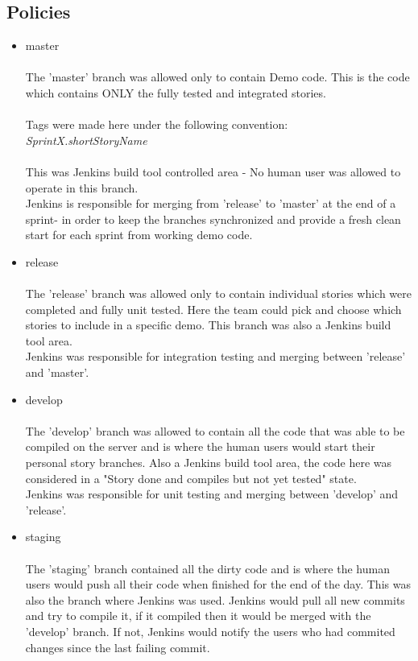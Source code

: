 \subsection {Policies}
\begin{itemize}
\item master\\ \\
The 'master' branch was allowed only to contain Demo code. This is the code which contains ONLY the fully tested and integrated stories.  \\\\Tags were made here under the following convention:\\ \emph{SprintX.shortStoryName} \\\\
This was Jenkins build tool controlled area - No human user was allowed to operate in this branch. \\Jenkins is responsible for merging from 'release' to 'master' at the end of a sprint- in order to keep the branches synchronized and provide a fresh clean start for each sprint from working demo code.\\
\item release\\ \\
The 'release' branch was allowed only to contain individual stories which were completed and fully unit tested. Here the team could pick and choose which stories to include in a specific demo. This branch was also a Jenkins build tool area. \\Jenkins was responsible for integration testing and merging between 'release' and 'master'.
\item develop\\ \\
The 'develop' branch was allowed to contain all the code that was able to be compiled on the server and is where the human users would start their personal story branches. Also a Jenkins build tool area, the code here was considered in a "Story done and compiles but not yet tested" state.\\ Jenkins was responsible for unit testing and merging between 'develop' and 'release'.

\item staging \\ \\
The 'staging' branch contained all the dirty code and is where the human users would push all their code when finished for the end of the day. This was also the branch where Jenkins was used. Jenkins would pull all new commits and try to compile it, if it compiled then it would be merged with the 'develop' branch. If not, Jenkins would notify the users who had commited changes since the last failing commit.


\end{itemize}
